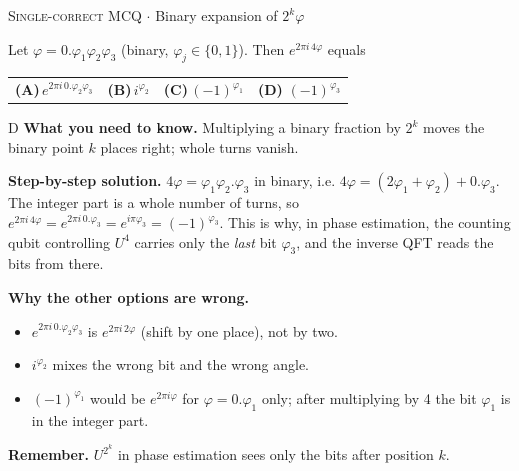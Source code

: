 \documentclass[11pt,a4paper]{article}
\newcommand{\optlabel}[1]{\textbf{(#1)}}
\newcommand{\correctlabel}[1]{\textcolor{okgreen}{\textbf{(#1)}\,\ding{51}}}
\newenvironment{qitem}[1]{\begin{list}{}{\setlength{\leftmargin}{3.3em}\setlength{\labelwidth}{3.1em}%
  \setlength{\labelsep}{0.2em}\setlength{\topsep}{3pt}\setlength{\parsep}{3pt}}\item[\textbf{Q.#1}\hfill]}{\end{list}}
\newcommand{\qsep}{\par\vspace{2pt}{\color{black!15}\hrule}\vspace{4pt}}
\newcommand{\qmeta}[2]{{\footnotesize\color{black!60}\textsc{#1} \;$\cdot$\; #2}\par}
\begin{document}
\begin{qitem}{14}
\qmeta{Single-correct MCQ}{Binary expansion of $2^k\varphi$}
Let $\varphi = 0.\varphi_1\varphi_2\varphi_3$ (binary, $\varphi_j \in \{0,1\}$). Then $e^{2\pi i\,4\varphi}$ equals
\par\smallskip\noindent\begin{tabularx}{\linewidth}{@{}*{4}{L}@{}}
\optlabel{A}\,$e^{2\pi i\,0.\varphi_2\varphi_3}$ & \optlabel{B}\,$i^{\varphi_2}$ & \optlabel{C}\,$(-1)^{\varphi_1}$ & \correctlabel{D}\,$(-1)^{\varphi_3}$
\end{tabularx}
\end{qitem}
\begin{solbox}{D}
\textbf{\color{brand}What you need to know.} Multiplying a binary fraction by $2^k$ moves the binary point $k$ places right; whole turns vanish.

\textbf{\color{brand}Step-by-step solution.} $4\varphi = \varphi_1\varphi_2.\varphi_3$ in binary, i.e. $4\varphi = (2\varphi_1 + \varphi_2) + 0.\varphi_3$. The integer part is a
whole number of turns, so $e^{2\pi i\,4\varphi} = e^{2\pi i\,0.\varphi_3} = e^{i\pi\varphi_3} = (-1)^{\varphi_3}$.
This is why, in phase estimation, the counting qubit controlling $U^{4}$ carries only the \emph{last} bit $\varphi_3$, and the
inverse QFT reads the bits from there.

\textbf{\color{brand}Why the other options are wrong.}
\begin{itemize}[leftmargin=2.4em, itemsep=1pt, topsep=2pt]
\item[\textbf{(A)}] $e^{2\pi i\,0.\varphi_2\varphi_3}$ is $e^{2\pi i\,2\varphi}$ (shift by one place), not by two.
\item[\textbf{(B)}] $i^{\varphi_2}$ mixes the wrong bit and the wrong angle.
\item[\textbf{(C)}] $(-1)^{\varphi_1}$ would be $e^{2\pi i\varphi}$ for $\varphi = 0.\varphi_1$ only; after multiplying by 4 the bit $\varphi_1$ is in the integer part.
\end{itemize}
\textbf{\color{brand}Remember.} $U^{2^k}$ in phase estimation sees only the bits after position $k$.
\end{solbox}
\qsep
\end{document}
